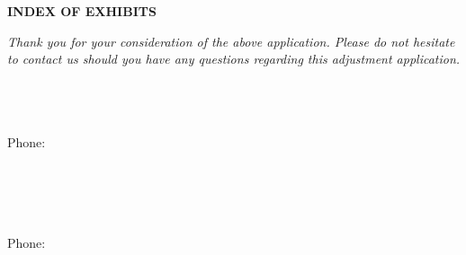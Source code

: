 \documentclass{letter}
\newcounter{labelcounter}
\newcommand{\centerlabel}[1]{
\stepcounter{labelcounter}
\newpage

    \thispagestyle{empty}
    \begin{center}
        \vspace*{\fill}
        \Huge Exhibit-\thelabelcounter \\ \vspace{1cm} \large #1
        \vspace*{\fill}
    \end{center}
    \newpage
}
\begin{document}
\begin{center}
\textbf{INDEX OF EXHIBITS}\\
\end{center}

\vspace{1.5cm}

\vfill

\textit{Thank you for your consideration of the above application. Please do not hesitate to contact us should you have any questions regarding this adjustment application.}

\begin{minipage}[t]{0.5\textwidth}

\vspace{2cm}
\textbf{\pApplicant} \\
\pAddress\\
\pCity\\
Phone: \pPhone \\
\pEmail \\
\end{minipage}%
\begin{minipage}[t]{0.5\textwidth}
\vspace{2cm}
\begin{flushright}
\textbf{\dApplicant} \\
\dAddress\\
\dCity\\
Phone: \dPhone \\
\dEmail\\
\end{flushright}
\end{minipage}













% 
% 
\end{document}

